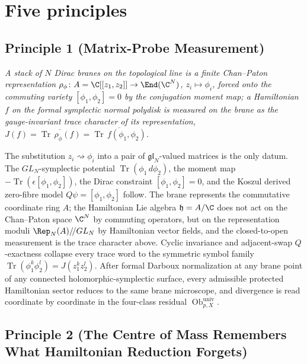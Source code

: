 \section*{Five principles}\label{sec:organizing-principles}

\subsection*{Principle 1 (Matrix-Probe Measurement)}

\emph{A stack of \(N\) Dirac branes on the topological line is a
finite Chan--Paton representation
\(\rho_\phi\colon A=\C[[z_1,z_2]]\to\End(\C^N)\),
\(z_i\mapsto\phi_i\), forced onto the commuting variety
\([\phi_1,\phi_2]=0\) by the conjugation moment map; a Hamiltonian
\(f\) on the formal symplectic normal polydisk is measured on the
brane as the gauge-invariant trace character of its representation,
\(J(f)=\overline{\operatorname{Tr}\,\rho_\phi(f)}=
\overline{\operatorname{Tr}\,f(\phi_1,\phi_2)}\).}

The substitution \(z_i\rightsquigarrow\phi_i\) into a pair of
\(\mathfrak{gl}_N\)-valued matrices is the only datum.  The
\(GL_N\)-symplectic potential \(\operatorname{Tr}(\phi_1\,d\phi_2)\),
the moment map \(-\operatorname{Tr}(\epsilon[\phi_1,\phi_2])\), the
Dirac constraint \([\phi_1,\phi_2]=0\), and the Koszul derived
zero-fibre model \(Q\psi=[\phi_1,\phi_2]\) follow.  The brane
represents the commutative coordinate ring \(A\); the Hamiltonian
Lie algebra \(\mathfrak h=A/\C\) does not act on the Chan--Paton
space \(\C^N\) by commuting operators, but on the representation
moduli \(\Rep_N(A)/\!/GL_N\) by Hamiltonian vector fields, and the
closed-to-open measurement is the trace character above.  Cyclic
invariance and adjacent-swap \(Q\)-exactness collapse every trace
word to the symmetric symbol family
\(\operatorname{Tr}(\phi_1^k\phi_2^l)=J(z_1^kz_2^l)\).  After formal
Darboux normalization at any brane point of any connected
holomorphic-symplectic surface, every admissible protected
Hamiltonian sector reduces to the same brane microscope, and
divergence is read coordinate by coordinate in the four-class
residual \(\operatorname{Ob}^{\mathrm{univ}}_{p,X}\).

\subsection*{Principle 2 (The Centre of Mass Remembers What Hamiltonian Reduction Forgets)}

